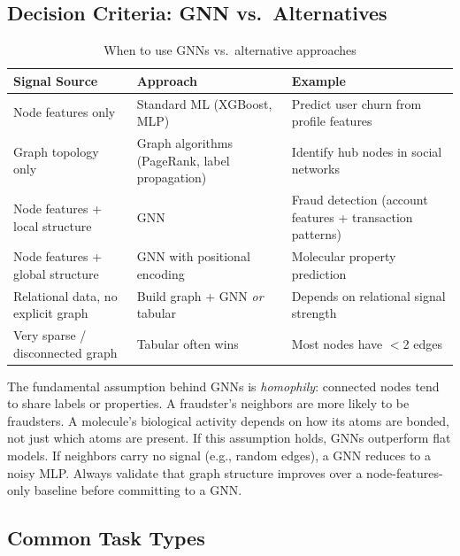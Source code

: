 \subsection{Decision Criteria: GNN vs.\ Alternatives}

\begin{table}[H]
\centering
\caption{When to use GNNs vs.\ alternative approaches}
\begin{tabularx}{\textwidth}{lXX}
\toprule
\textbf{Signal Source} & \textbf{Approach} & \textbf{Example} \\
\midrule
Node features only & Standard ML (XGBoost, MLP) & Predict user churn from profile features \\
Graph topology only & Graph algorithms (PageRank, label propagation) & Identify hub nodes in social networks \\
Node features + local structure & GNN & Fraud detection (account features + transaction patterns) \\
Node features + global structure & GNN with positional encoding & Molecular property prediction \\
Relational data, no explicit graph & Build graph + GNN \textit{or} tabular & Depends on relational signal strength \\
Very sparse / disconnected graph & Tabular often wins & Most nodes have $<$2 edges \\
\bottomrule
\end{tabularx}
\end{table}

\begin{keyinsight}
The fundamental assumption behind GNNs is \textit{homophily}: connected nodes tend to share labels or properties. A fraudster's neighbors are more likely to be fraudsters. A molecule's biological activity depends on how its atoms are bonded, not just which atoms are present. If this assumption holds, GNNs outperform flat models. If neighbors carry no signal (e.g., random edges), a GNN reduces to a noisy MLP. Always validate that graph structure improves over a node-features-only baseline before committing to a GNN.
\end{keyinsight}

\subsection{Common Task Types}

